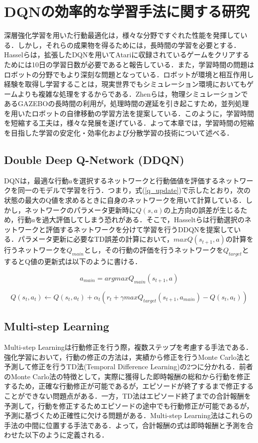 \documentclass[12pt]{sonota/aislab}
\begin{document}
\section{DQNの効率的な学習手法に関する研究}
深層強化学習を用いた行動最適化は，様々な分野ですぐれた性能を発揮している．しかし，それらの成果物を得るためには，長時間の学習を必要とする．Hasselらは，拡張したDQNを用いてAtariに収録されているゲームをクリアするためには10日の学習日数が必要であると報告している\cite{rainbow}．また，学習時間の問題はロボットの分野でもより深刻な問題となっている．ロボットが環境と相互作用し経験を取得し学習することは，現実世界でもシミュレーション環境においてもゲームよりも複雑な処理をするからである．Zhenらは，物理シミュレーションであるGAZEBO\cite{GAZEBO}の長時間の利用が，処理時間の遅延を引き起こすため，並列処理を用いたロボットの自律移動の学習方法を提案している\cite{pararell}．このように，学習時間を短縮する工夫は，様々な発展を遂げている．よって本章では，学習時間の短縮を目指した学習の安定化・効率化および分散学習の技術について述べる．

\subsection{Double Deep Q-Network (DDQN)}
DQNは，最適な行動$a$を選択するネットワークと行動価値を評価するネットワークを同一のモデルで学習を行う．つまり，式(\ref{q_update})で示したとおり，次の状態の最大のQ値を求めるときに自身のネットワークを用いて計算している．しかし，ネットワークのパラメータ更新時に$Q(s,a)$の上方向の誤差が生じるため，行動$a$を過大評価してしまう恐れがある．そこで，Hasseltらは行動選択のネットワークと評価するネットワークを分けて学習を行うDDQNを提案している\cite{double}．パラメータ更新に必要なTD誤差の計算において，$maxQ(s_{t+1},a)$の計算を行うネットワークを$Q_{main}$とし，その行動の評価を行うネットワークを$Q_{target}$とするとQ値の更新式は以下のように書ける．

\begin{equation}
\label{a_main}
a_{main}=argmaxQ_{main}(s_{t+1},a)
\end{equation}

\begin{equation}
\label{double_q_update}
Q(s_{t},a_{t} )←Q(s_{t},a_{t} )+ α_{t} (r_{t}+ \gamma maxQ_{target}(s_{t+1},a_{main})-Q(s_{t},a_{t}))
\end{equation}

\subsection{Multi-step Learning}
Multi-step Learningは行動修正を行う際，複数ステップを考慮する手法である\cite{rl_book}．強化学習において，行動の修正の方法は，実績から修正を行うMonte Carlo法と予測して修正を行うTD法(Temporal Difference Learning)の2つに分かれる．前者のMonte Carlo法の特徴として，実際に獲得した即時報酬の総和から行動を修正するため，正確な行動修正が可能であるが，エピソードが終了するまで修正することができない問題点がある．一方，TD法はエピソード終了までの合計報酬を予測して，行動を修正するためエピソードの途中でも行動修正が可能であるが，予測に基づくため正確性に欠ける問題がある．Multi-step Learning法はこれらの手法の中間に位置する手法である．よって，合計報酬の式は即時報酬と予測を合わせた以下のように定義される．
\end{document}
